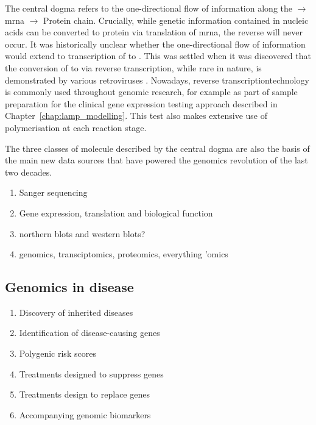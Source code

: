 \documentclass[thesis.tex]{subfiles}
\begin{document}
The central dogma refers to the one-directional flow of information along the  $\rightarrow$ \gls{mrna} $\rightarrow$ Protein chain. Crucially, while genetic information contained in nucleic acids can be converted to protein via translation of \gls{mrna}, the reverse will never occur. It was historically unclear whether the one-directional flow of information would extend to transcription of  to . This was settled when it was discovered that the conversion of   to   via reverse transcription, while rare in nature, is demonstrated by various retroviruses \citep{baltimore_rna-dependent_1970, temin_rna-dependent_1970, coffin_discovery_2016}. Nowadays, reverse transcriptiontechnology  is commonly used throughout genomic research, for example as part of sample preparation for the clinical gene expression testing approach described in Chapter~\ref{chap:lamp_modelling}. This test also makes extensive use of  polymerisation at each reaction stage.

The three classes of molecule described by the central dogma are also the basis of the main new data sources that have powered the genomics revolution of the last two decades.

{\color{red}
\begin{enumerate}
    \item Sanger sequencing
    \item Gene expression, translation and biological function
    \item northern blots and western blots?
    \item genomics, transciptomics, proteomics, everything 'omics
\end{enumerate}
}

\subsection{Genomics in disease}
{\color{red}
\begin{enumerate}
    \item Discovery of inherited diseases
    \item Identification of disease-causing genes
    \item Polygenic risk scores
    \item Treatments designed to suppress genes
    \item Treatments design to replace genes 
    \item Accompanying genomic biomarkers
\end{enumerate}
}
\end{document}
